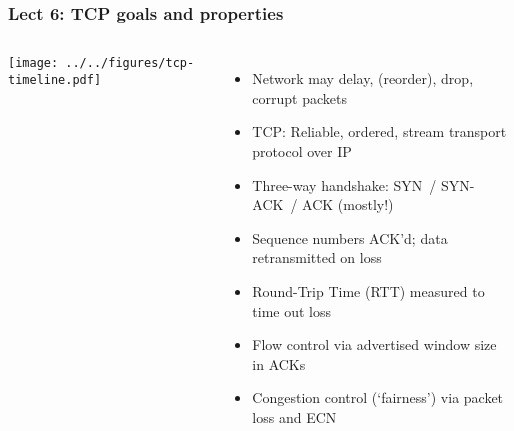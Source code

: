 \begin{frame}
  \frametitle{Lect 6: TCP goals and properties}

  \begin{columns}[T]
      \smallskip
      \begin{center}
	\texttt{[image: ../../figures/tcp-timeline.pdf]}
      \end{center}


      \pause

      \begin{itemize}
	\item Network may delay, (reorder), drop, corrupt packets

	\pause

	\item TCP: Reliable, ordered, stream transport protocol over IP


	\pause

	\item Three-way handshake: SYN~/ SYN-ACK~/ ACK (mostly!)

	\pause

	\item Sequence numbers ACK'd; data retransmitted on loss

	\pause

	\item Round-Trip Time (RTT) measured to time out loss

	\pause

        \item Flow control via advertised window size in ACKs

	\pause

	\item Congestion control (`fairness') via packet loss and ECN


      \end{itemize}

  \end{columns}
\end{frame}

